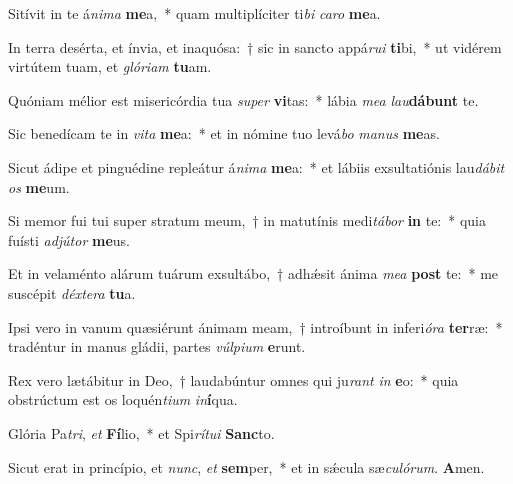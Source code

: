 Sitívit in te á\textit{ni}\textit{ma} \textbf{me}a,~* quam multiplíciter ti\textit{bi} \textit{ca}\textit{ro} \textbf{me}a.

In terra desérta, et ínvia, et inaquósa:~† sic in sancto appá\textit{ru}\textit{i} \textbf{ti}bi,~* ut vidérem virtútem tuam, et \textit{gló}\textit{ri}\textit{am} \textbf{tu}am.

Quóniam mélior est misericórdia tua \textit{su}\textit{per} \textbf{vi}tas:~* lábia \textit{me}\textit{a} \textit{lau}\textbf{dá}\textbf{bunt} te.

Sic benedícam te in \textit{vi}\textit{ta} \textbf{me}a:~* et in nómine tuo levá\textit{bo} \textit{ma}\textit{nus} \textbf{me}as.

Sicut ádipe et pinguédine repleátur á\textit{ni}\textit{ma} \textbf{me}a:~* et lábiis exsultatiónis lau\textit{dá}\textit{bit} \textit{os} \textbf{me}um.

Si memor fui tui super stratum meum,~† in matutínis medi\textit{tá}\textit{bor} \textbf{in} te:~* quia fuísti \textit{ad}\textit{jú}\textit{tor} \textbf{me}us.

Et in velaménto alárum tuárum exsultábo,~† adhǽsit ánima \textit{me}\textit{a} \textbf{post} te:~* me suscépit \textit{déx}\textit{te}\textit{ra} \textbf{tu}a.

Ipsi vero in vanum quæsiérunt ánimam meam,~† introíbunt in inferi\textit{ó}\textit{ra} \textbf{ter}ræ:~* tradéntur in manus gládii, partes \textit{vúl}\textit{pi}\textit{um} \textbf{e}runt.

Rex vero lætábitur in Deo,~† laudabúntur omnes qui ju\textit{rant} \textit{in} \textbf{e}o:~* quia obstrúctum est os loquén\textit{ti}\textit{um} \textit{in}\textbf{í}qua.

Glória Pa\textit{tri}, \textit{et} \textbf{Fí}lio,~* et Spi\textit{rí}\textit{tu}\textit{i} \textbf{Sanc}to.

Sicut erat in princípio, et \textit{nunc}, \textit{et} \textbf{sem}per,~* et in sǽcula sæ\textit{cu}\textit{ló}\textit{rum}. \textbf{A}men.

